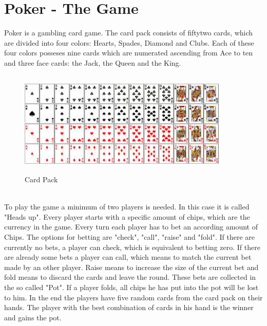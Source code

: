 \documentclass[12pt,fleqn,a4paper]{article}
\begin{document}
\section{Poker - The Game}
Poker is a gambling card game. The card pack consists of fiftytwo cards, which are divided into four colors: Hearts, Spades, Diamond and Clubs. Each of these four colors posseses nine cards which are numerated ascending from Ace to ten and three face cards: the Jack, the Queen and the King.
\begin{figure}[!h]
	\begin{center}
		\includegraphics[width=10cm, height=5cm]{cards.jpg}
		\caption{Card Pack}
	\end{center}
\end{figure}
\\
To play the game a minimum of two players is needed. In this case it is called "Heads up". Every player starts with a specific amount of chips, which are the currency in the game. Every turn each player has to bet an according amount of Chips. The options for betting are "check", "call", "raise" and "fold". If there are currently no bets, a player can check, which is equivalent to betting zero. If there are already some bets a player can call, which means to match the current bet made by an other player. Raise means to increase the size of the current bet and fold means to discard the cards and leave the round. These bets are collected in the so called "Pot". If a player folds, all chips he has put into the pot will be lost to him. In the end the players have five random cards from the card pack on their hands. The player with the best combination of cards in his hand is the winner and gains the pot.
\end{document}
